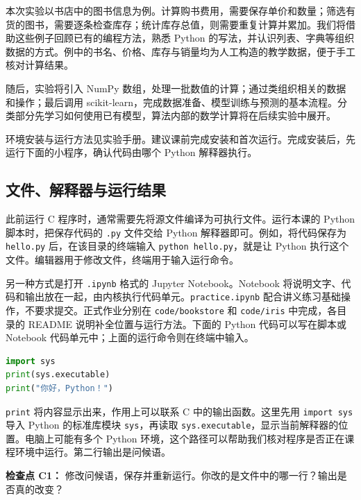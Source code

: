 \documentclass[UTF8,a4paper,11pt,fontset=fandol]{ctexart}
\providecommand{\passthrough}[1]{#1}
\begin{document}
本次实验以书店中的图书信息为例。计算购书费用，需要保存单价和数量；筛选有货的图书，需要逐条检查库存；统计库存总值，则需要重复计算并累加。我们将借助这些例子回顾已有的编程方法，熟悉 Python 的写法，并认识列表、字典等组织数据的方式。例中的书名、价格、库存与销量均为人工构造的教学数据，便于手工核对计算结果。

随后，实验将引入 NumPy 数组，处理一批数值的计算；通过类组织相关的数据和操作；最后调用 scikit-learn，完成数据准备、模型训练与预测的基本流程。分类部分先学习如何使用已有模型，算法内部的数学计算将在后续实验中展开。

环境安装与运行方法见实验手册。建议课前完成安装和首次运行。完成安装后，先运行下面的小程序，确认代码由哪个 Python 解释器执行。

\subsection{文件、解释器与运行结果}\label{ux6587ux4ef6ux89e3ux91caux5668ux4e0eux8fd0ux884cux7ed3ux679c}

此前运行 C 程序时，通常需要先将源文件编译为可执行文件。运行本课的 Python 脚本时，把保存代码的 \passthrough{\lstinline!.py!} 文件交给 Python 解释器即可。例如，将代码保存为 \passthrough{\lstinline!hello.py!} 后，在该目录的终端输入 \passthrough{\lstinline!python hello.py!}，就是让 Python 执行这个文件。编辑器用于修改文件，终端用于输入运行命令。

另一种方式是打开 \passthrough{\lstinline!.ipynb!} 格式的 Jupyter Notebook。Notebook 将说明文字、代码和输出放在一起，由内核执行代码单元。\passthrough{\lstinline!practice.ipynb!} 配合讲义练习基础操作，不要求提交。正式作业分别在 \passthrough{\lstinline!code/bookstore!} 和 \passthrough{\lstinline!code/iris!} 中完成，各目录的 README 说明补全位置与运行方法。下面的 Python 代码可以写在脚本或 Notebook 代码单元中；上面的运行命令则在终端中输入。

\begin{lstlisting}[language=Python]
import sys
print(sys.executable)
print("你好，Python！")
\end{lstlisting}

\passthrough{\lstinline!print!} 将内容显示出来，作用上可以联系 C 中的输出函数。这里先用 \passthrough{\lstinline!import sys!} 导入 Python 的标准库模块 \passthrough{\lstinline!sys!}，再读取 \passthrough{\lstinline!sys.executable!}，显示当前解释器的位置。电脑上可能有多个 Python 环境，这个路径可以帮助我们核对程序是否正在课程环境中运行。第二行输出是问候语。

\textbf{检查点 C1：} 修改问候语，保存并重新运行。你改的是文件中的哪一行？输出是否真的改变？
\end{document}
